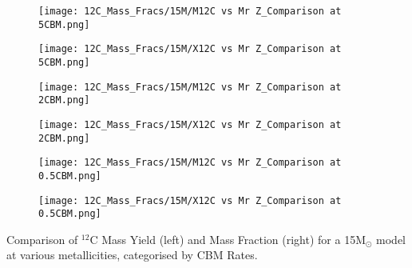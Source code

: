 \begin{minipage}{\textwidth}
	\centering
	\begin{subfigure}{0.49\textwidth}
		\texttt{[image: 12C\_Mass\_Fracs/15M/M12C vs Mr Z\_Comparison at 5CBM.png]}
	\end{subfigure}
        \hfill
	\begin{subfigure}{0.49\textwidth}
		\texttt{[image: 12C\_Mass\_Fracs/15M/X12C vs Mr Z\_Comparison at 5CBM.png]}
	\end{subfigure}
        \label{fig:12C_15M_5CBM}
\end{minipage}
\begin{minipage}{\textwidth}
	\centering
	\begin{subfigure}{0.49\textwidth}
		\texttt{[image: 12C\_Mass\_Fracs/15M/M12C vs Mr Z\_Comparison at 2CBM.png]}
	\end{subfigure}
        \hfill
	\begin{subfigure}{0.49\textwidth}
		\texttt{[image: 12C\_Mass\_Fracs/15M/X12C vs Mr Z\_Comparison at 2CBM.png]}
	\end{subfigure}
        \label{fig:12C_15M_2CBM}
\end{minipage}
\begin{minipage}{\textwidth}
	\centering
	\begin{subfigure}{0.49\textwidth}
		\texttt{[image: 12C\_Mass\_Fracs/15M/M12C vs Mr Z\_Comparison at 0.5CBM.png]}
	\end{subfigure}
        \hfill
	\begin{subfigure}{0.49\textwidth}
		\texttt{[image: 12C\_Mass\_Fracs/15M/X12C vs Mr Z\_Comparison at 0.5CBM.png]}
	\end{subfigure}
	 \caption{Comparison of $^{12}$C Mass Yield (left) and Mass Fraction (right) for a 15M$_\odot$ model at various metallicities, categorised by CBM Rates.}
        \label{fig:12C_15M_0.5CBM}
\end{minipage}

